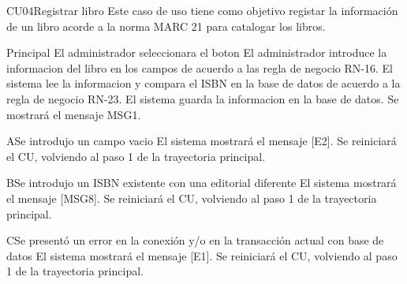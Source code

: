 \begin{UseCase}{CU04}{Registrar libro}{
		Este caso de uso tiene como objetivo registar la información de un libro acorde a la norma MARC 21 para catalogar los libros.
	}
\end{UseCase}
\begin{UCtrayectoria}{Principal}
	\UCpaso[\UCactor] El administrador seleccionara el boton 	
	\UCpaso[\UCactor] El administrador introduce la informacion del libro en los campos de acuerdo a las regla de negocio RN-16. 
	\UCpaso[\UCsist] El sistema lee la informacion y compara el ISBN en la base de datos de acuerdo a la regla de negocio RN-23. 
	\UCpaso[\UCsist] El sistema guarda la informacion en la base de datos. 
	\UCpaso[\UCsist] Se mostrará el mensaje MSG1.
\end{UCtrayectoria}
\begin{UCtrayectoriaA}{A}{Se introdujo un campo vacio}	
			\UCpaso[\UCsist] El sistema mostrará el mensaje [E2].
			\UCpaso[\UCsist] Se reiniciará el CU, volviendo al paso 1 de la trayectoria principal. 
\end{UCtrayectoriaA}
\begin{UCtrayectoriaA}{B}{Se introdujo un ISBN existente con una editorial diferente}	
			\UCpaso[\UCsist] El sistema mostrará el mensaje [MSG8].
			\UCpaso[\UCsist] Se reiniciará el CU, volviendo al paso 1 de la trayectoria principal. 
\end{UCtrayectoriaA}
\begin{UCtrayectoriaA}{C}{Se presentó un error en la conexión y/o en la transacción actual con base de datos}
			\UCpaso[\UCsist] El sistema mostrará el mensaje [E1].
			\UCpaso[\UCsist] Se reiniciará el CU, volviendo al paso 1 de la trayectoria principal.
\end{UCtrayectoriaA}
